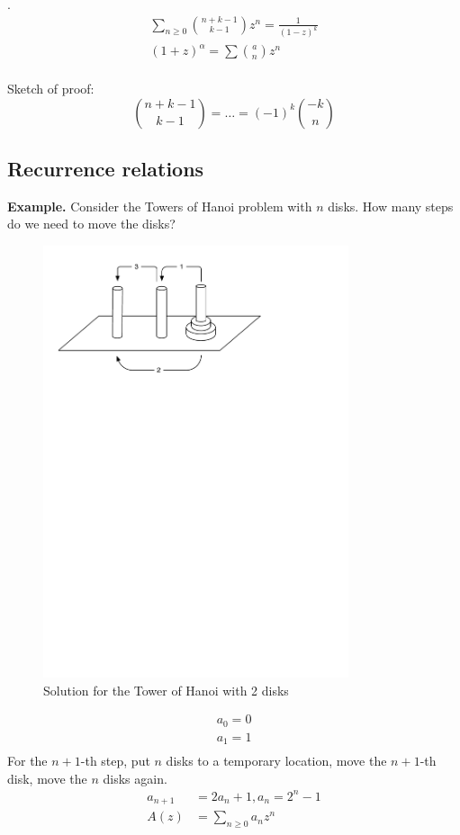 \Lemma.
\begin{gather*}
    \sum_{n≥0} {\binom{n+k-1}{k-1}} z^n
    = \frac1{(1-z)^k} \\
    (1 + z)^\alpha = \sum {\binom{a}{n}} z^n \\
\end{gather*}

Sketch of proof:
\[
    {\binom{n+k-1} {k-1}} = \ldots = (-1)^k{\binom{-k}{n}}
\]


\subsection{Recurrence relations}

\textbf{Example.}
Consider the Towers of Hanoi problem with $n$ disks. How many steps do we need to move the disks?

\begin{figure}[htbp]
  \centering  \includegraphics[width=0.8\textwidth]{02_higher_combinatorics/pics/TowerOfHanoi}
  \caption{Solution for the Tower of Hanoi with 2 disks}
\end{figure}
\begin{align*}
  a_0 = 0 \\
  a_1 = 1 \\
\end{align*}
For the $n+1$-th step, put $n$ disks to a temporary location, move the $n+1$-th disk, move the $n$ disks again.
\begin{align*}
  a_{n+1} &= 2 a_n + 1, a_n = 2^n - 1\\
  A(z) &= \sum_{n \geq 0} a_n z^n
\end{align*}

